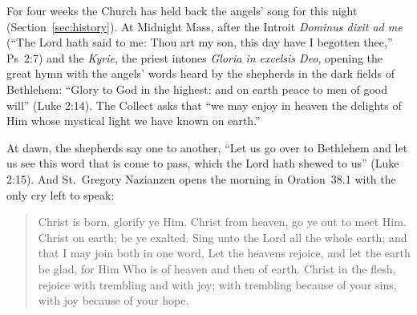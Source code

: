 For four weeks the Church has held back the angels' song for this night
(Section~\ref{sec:history}). At Midnight Mass, after the Introit \textit{Dominus
dixit ad me} (``The Lord hath said to me: Thou art my son, this day have I
begotten thee,'' Ps~2:7) and the \textit{Kyrie}, the priest intones
\textit{Gloria in excelsis Deo}, opening the great hymn with the angels' words
heard by the shepherds in the dark fields of Bethlehem: ``Glory to God in the
highest: and on earth peace to men of good will'' (Luke 2:14). The Collect asks
that ``we may enjoy in heaven the delights of Him whose mystical light we have
known on earth.''

At dawn, the shepherds say one to another, ``Let us go over to Bethlehem and
let us see this word that is come to pass, which the Lord hath shewed to us''
(Luke 2:15). And St.~Gregory Nazianzen opens the morning in Oration~38.1 with
the only cry left to speak:

\begin{quote}
Christ is born, glorify ye Him. Christ from heaven, go ye out to meet Him.
Christ on earth; be ye exalted. Sing unto the Lord all the whole earth; and
that I may join both in one word, Let the heavens rejoice, and let the earth be
glad, for Him Who is of heaven and then of earth. Christ in the flesh, rejoice
with trembling and with joy; with trembling because of your sins, with joy
because of your hope.
\end{quote}
